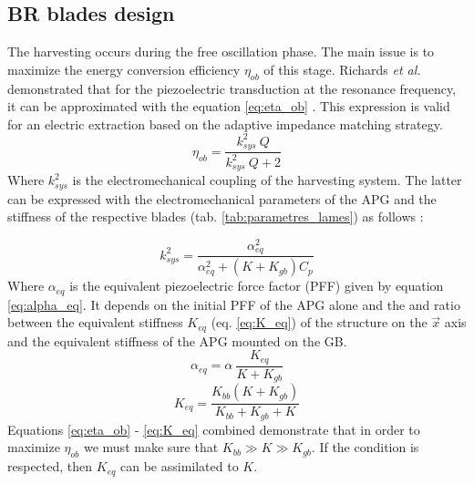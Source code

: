 \documentclass[3p,twocolumn,preprint]{elsarticle}
\begin{document}
	\subsection{BR blades design}	
	\label{subsec:BR blades design}
The harvesting occurs during the free oscillation phase. The main issue is to maximize the energy conversion efficiency $\eta_{ob}$ of this stage. Richards \emph{et al.} demonstrated that for the piezoelectric transduction at the resonance frequency, it can be approximated with the equation \ref{eq:eta_ob} \cite{Richards2004}. This expression is valid for an electric extraction based on the adaptive impedance matching strategy.
\begin{equation}
	\eta_{ob} = \dfrac{k^2_{sys}\ Q}{k^2_{sys}\ Q + 2}
	\label{eq:eta_ob}
\end{equation}
Where $k^2_{sys}$ is the electromechanical coupling of the harvesting system. The latter can be expressed with the electromechanical parameters of the APG and the stiffness of the respective blades (tab. \ref{tab:parametres_lames}) as follows :

\begin{equation}
	k^2_{sys} = \dfrac{\alpha^2_{eq}}{\alpha^2_{eq} + (K+K_{gb})C_p}
	\label{eq:k2_sys}
\end{equation}
Where $\alpha_{eq}$ is the equivalent piezoelectric force factor (PFF) given by equation \ref{eq:alpha_eq}. It depends on the initial PFF of the APG alone and the and ratio between the equivalent stiffness $K_{eq}$ (eq. \ref{eq:K_eq}) of the structure on the $\vec{x}$ axis and the equivalent stiffness of the APG mounted on the GB.
\begin{equation}
	\alpha_{eq} = \alpha\ \dfrac{K_{eq}}{K + K_{gb}} 
	\label{eq:alpha_eq}
\end{equation}
\begin{equation}
	K_{eq} = \dfrac{K_{bb}(K + K_{gb})}{K_{bb} + K_{gb} + K}
	\label{eq:K_eq}
\end{equation}
Equations \ref{eq:eta_ob} - \ref{eq:K_eq} combined demonstrate that in order to maximize $\eta_{ob}$ we must make sure that $K_{bb} \gg K \gg K_{gb}$. If the condition is respected, then $K_{eq}$ can be assimilated to $K$. 
\end{document}
